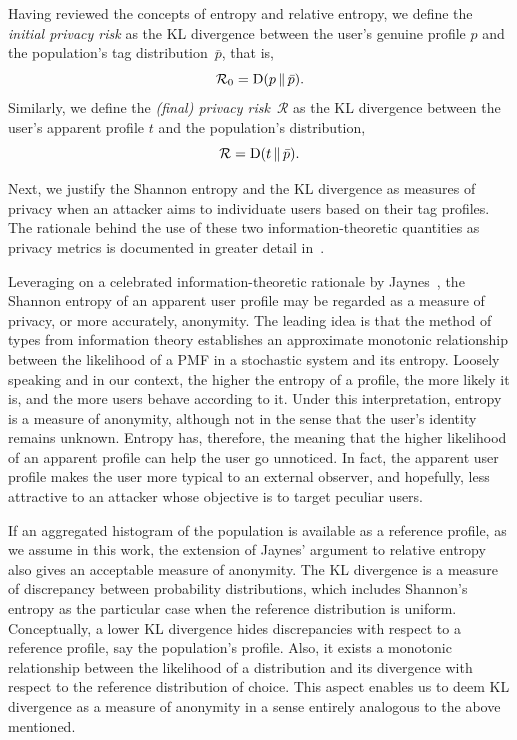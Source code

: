 Having reviewed the concepts of entropy and relative entropy, we define the \emph{initial privacy risk} as the KL divergence between the user's genuine profile $p$ and the population's tag distribution~$\bar{p}$, that is, $$\mathcal{R}_0 = \operatorname{D}(p\,\|\,\bar{p}).$$
Similarly, we define the \emph{(final) privacy risk}~$\mathcal{R}$ as the KL divergence between the user's apparent profile $t$ and the population's distribution, $$\mathcal{R}=\operatorname{D}(t\,\|\,\bar{p}).$$

Next, we justify the Shannon entropy and the KL divergence as measures of privacy when an attacker aims to individuate users based on their tag profiles.
The rationale behind the use of these two information-theoretic quantities as privacy metrics is documented in greater detail in~\cite{parra2014measuring}.

Leveraging on a celebrated information-theoretic rationale by Jaynes~\cite{jaynes1982rationale}, the Shannon entropy of an apparent user profile may be regarded as a measure of privacy, or more accurately, anonymity.
The leading idea is that the method of types from information theory establishes an approximate monotonic relationship between the likelihood of a PMF in a stochastic system and its entropy. Loosely speaking and in our context, the higher the entropy of a profile, the more likely it is, and the more users behave according to it. Under this interpretation, entropy is a measure of anonymity, although not in the sense that the user's identity remains unknown. Entropy has, therefore, the meaning that the higher likelihood of an apparent profile can help the user go unnoticed. In fact, the apparent user profile makes the user more typical to an external observer, and hopefully, less attractive to an attacker whose objective is to target peculiar users.

If an aggregated histogram of the population is available as a reference profile, as we assume in this work, the extension of Jaynes' argument to relative entropy also gives an acceptable measure of anonymity.
The KL divergence is a measure of discrepancy between probability distributions, which includes Shannon's entropy as the particular case when the reference distribution is uniform.
Conceptually, a lower KL divergence hides discrepancies with respect to a reference profile, say the population's profile. Also, it exists a monotonic relationship between the likelihood of a distribution and its divergence with respect to the reference distribution of choice. This aspect enables us to deem KL divergence as a measure of anonymity in a sense entirely analogous to the above mentioned.


